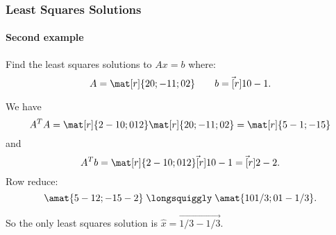 
\begin{frame}
\frametitle{Least Squares Solutions}
\framesubtitle{Second example}

Find the least squares solutions to $Ax=b$ where:
\[ A = \mat[r]{2 0; -1 1; 0 2} \qquad b = \vec[r]{1 0 -1}. \]

\begin{webonly}
  We have
  \[ A^T A = \mat[r]{2 -1 0; 0 1 2}\mat[r]{2 0; -1 1; 0 2} =
  \mat[r]{5 -1; -1 5} \]
  and
  \[ A^T b = \mat[r]{2 -1 0; 0 1 2}\vec[r]{1 0 -1}
  = \vec[r]{2 -2}. \]
  Row reduce:
  \[ \amat{5 -1 2; -1 5 -2} \;\longsquiggly\;
  \amat{1 0 1/3; 0 1 -1/3}. \]
\end{webonly}%
\pause
So the only least squares solution is $\hat x = \vec{1/3 -1/3}$.

\end{frame}



